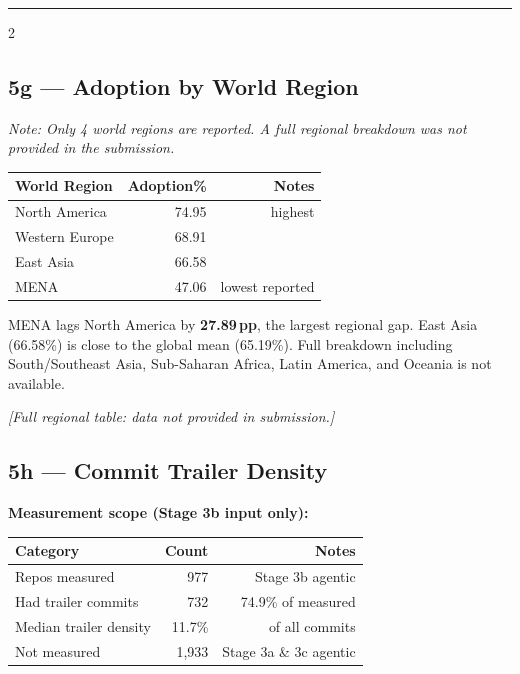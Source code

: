 \documentclass[10pt,a4paper]{article}
\begin{document}
\vspace{4pt}
\hrule
\vspace{4pt}

\begin{multicols}{2}
\footnotesize

\subsection*{5g --- Adoption by World Region}

\textit{Note: Only 4 world regions are reported. A full regional breakdown
was not provided in the submission.}

\vspace{2pt}
\begin{tabular}{@{}lrr@{}}
\toprule
World Region & Adoption\% & Notes \\
\midrule
North America   & 74.95 & highest \\
Western Europe  & 68.91 & \\
East Asia       & 66.58 & \\
MENA            & 47.06 & lowest reported \\
\bottomrule
\end{tabular}

\vspace{2pt}
{\small MENA lags North America by \textbf{27.89\,pp}, the largest regional gap.
East Asia (66.58\%) is close to the global mean (65.19\%).
Full breakdown including South/Southeast Asia, Sub-Saharan Africa, Latin America,
and Oceania is not available.}

\textit{\small [Full regional table: data not provided in submission.]}

\columnbreak

\subsection*{5h --- Commit Trailer Density}

\textbf{Measurement scope (Stage 3b input only):}

\vspace{2pt}
\begin{tabular}{@{}lrr@{}}
\toprule
Category & Count & Notes \\
\midrule
Repos measured        &   977 & Stage 3b agentic \\
Had trailer commits   &   732 & 74.9\% of measured \\
Median trailer density & 11.7\% & of all commits \\
Not measured          & 1,933 & Stage 3a \& 3c agentic \\
\bottomrule
\end{tabular}


\end{multicols}
\end{document}
